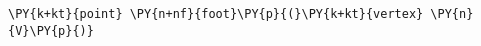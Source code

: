 \begin{Verbatim}[commandchars=\\\{\}]
    \PY{k+kt}{point} \PY{n+nf}{foot}\PY{p}{(}\PY{k+kt}{vertex} \PY{n}{V}\PY{p}{)}
\end{Verbatim}
